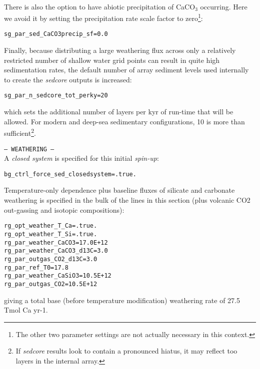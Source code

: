 \documentclass[10pt,twoside]{article}
\begin{document}
\begin{compactitem}
                \\ There is also the option to have abiotic precipitation of CaCO$_{3}$ occurring. Here we avoid it by setting the precipitation rate scale factor to zero\footnote{The other two parameter settings are not actually necessary in this context.}:
\vspace{-5pt}\begin{verbatim}
sg_par_sed_CaCO3precip_sf=0.0
                \end{verbatim}\vspace{-5pt}
Finally, because distributing a large weathering flux across only a relatively restricted number of shallow water grid points can result in quite high sedimentation rates, the default number of array sediment levels used internally to create the \textit{sedcore} outputs is increased:
\vspace{-5pt}\begin{verbatim}
sg_par_n_sedcore_tot_perky=20
                \end{verbatim}\vspace{-5pt}
                which sets the additional number of layers per kyr of run-time that will be allowed. For modern and deep-sea sedimentary configurations, 10 is more than sufficient\footnote{If \textsl{sedcore} results look to contain a pronounced hiatus, it may reflect too layers in the internal array.}.
                \item \texttt{--- WEATHERING ---}
                \\ A \textit{closed system} is specified for this initial \textsl{spin-up}:
\vspace{-5pt}\begin{verbatim}
bg_ctrl_force_sed_closedsystem=.true.
                \end{verbatim}\vspace{-5pt}
                Temperature-only dependence plus baseline fluxes of silicate and carbonate weathering is specified in the bulk of the lines in this section (plus volcanic CO2 out-gassing and isotopic compositions):
\vspace{-5pt}\begin{verbatim}
rg_opt_weather_T_Ca=.true.
rg_opt_weather_T_Si=.true.
rg_par_weather_CaCO3=17.0E+12
rg_par_weather_CaCO3_d13C=3.0
rg_par_outgas_CO2_d13C=3.0
rg_par_ref_T0=17.8
rg_par_weather_CaSiO3=10.5E+12 
rg_par_outgas_CO2=10.5E+12
                \end{verbatim}\vspace{-5pt}
giving a total base (before temperature modification) weathering rate of 27.5 Tmol Ca yr-1.

\end{compactitem}
\end{document}
